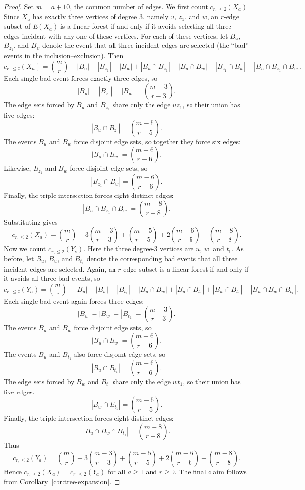 \documentclass[12pt,reqno]{amsart}
\theoremstyle{definition}
\begin{document}
\begin{proof}
Set $m=a+10$, the common number of edges. We first count $c_{r,\leq 2}(X_a)$. Since $X_a$ has exactly three vertices of degree $3$, namely $u$, $z_1$, and $w$, an $r$-edge subset of $E(X_a)$ is a linear forest if and only if it avoids selecting all three edges incident with any one of these vertices. For each of these vertices, let $B_u$, $B_{z_1}$, and $B_w$ denote the event that all three incident edges are selected (the ``bad'' events in the inclusion--exclusion). Then
\[
c_{r,\leq 2}(X_a)=\binom{m}{r}-|B_u|-|B_{z_1}|-|B_w|
+|B_u\cap B_{z_1}|+|B_u\cap B_w|+|B_{z_1}\cap B_w|
-|B_u\cap B_{z_1}\cap B_w|.
\]
Each single bad event forces exactly three edges, so
\[
|B_u|=|B_{z_1}|=|B_w|=\binom{m-3}{r-3}.
\]
The edge sets forced by $B_u$ and $B_{z_1}$ share only the edge
$uz_1$, so their union has five edges:
\[
|B_u\cap B_{z_1}|=\binom{m-5}{r-5}.
\]
The events $B_u$ and $B_w$ force disjoint edge sets, so together they force six edges:
\[
|B_u\cap B_w|=\binom{m-6}{r-6}.
\]
Likewise, $B_{z_1}$ and $B_w$ force disjoint edge sets, so
\[
|B_{z_1}\cap B_w|=\binom{m-6}{r-6}.
\]
Finally, the triple intersection forces eight distinct edges:
\[
|B_u\cap B_{z_1}\cap B_w|=\binom{m-8}{r-8}.
\]
Substituting gives
\[
c_{r,\leq 2}(X_a)
=
\binom{m}{r}
-3\binom{m-3}{r-3}
+\binom{m-5}{r-5}
+2\binom{m-6}{r-6}
-\binom{m-8}{r-8}.
\]
Now we count $c_{r,\leq 2}(Y_a)$. Here the three degree-$3$ vertices are $u$, $w$, and $t_1$. As before, let $B_u$, $B_w$, and $B_{t_1}$ denote the corresponding bad events that all three incident edges are selected. Again, an $r$-edge subset is a linear forest if and only if it avoids all three bad events, so
\[
c_{r,\leq 2}(Y_a)=\binom{m}{r}-|B_u|-|B_w|-|B_{t_1}|
+|B_u\cap B_w|+|B_u\cap B_{t_1}|+|B_w\cap B_{t_1}|
-|B_u\cap B_w\cap B_{t_1}|.
\]
Each single bad event again forces three edges:
\[
|B_u|=|B_w|=|B_{t_1}|=\binom{m-3}{r-3}.
\]
The events $B_u$ and $B_w$ force disjoint edge sets, so
\[
|B_u\cap B_w|=\binom{m-6}{r-6}.
\]
The events $B_u$ and $B_{t_1}$ also force disjoint edge sets, so
\[
|B_u\cap B_{t_1}|=\binom{m-6}{r-6}.
\]
The edge sets forced by $B_w$ and $B_{t_1}$ share only the edge
$wt_1$, so their union has five edges:
\[
|B_w\cap B_{t_1}|=\binom{m-5}{r-5}.
\]
Finally, the triple intersection forces eight distinct edges:
\[
|B_u\cap B_w\cap B_{t_1}|=\binom{m-8}{r-8}.
\]
Thus
\[
c_{r,\leq 2}(Y_a)
=
\binom{m}{r}
-3\binom{m-3}{r-3}
+\binom{m-5}{r-5}
+2\binom{m-6}{r-6}
-\binom{m-8}{r-8}.
\]
Hence $c_{r,\leq 2}(X_a)=c_{r,\leq 2}(Y_a)$ for all $a\geq 1$ and $r\geq 0$. The final claim follows from Corollary~\ref{cor:tree-expansion}.
\end{proof}
\end{document}

